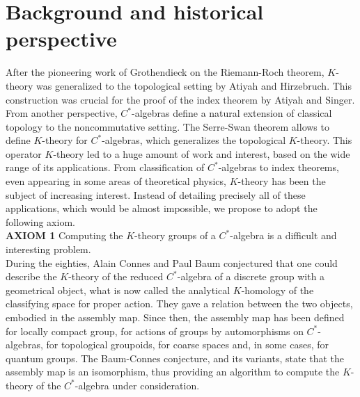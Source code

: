 \section*{Background and historical perspective}

After the pioneering work of Grothendieck on the Riemann-Roch theorem, $K$-theory was generalized to the topological setting by Atiyah and Hirzebruch. This construction was crucial for the proof of the index theorem by Atiyah and Singer. From another perspective, $C^*$-algebras define a natural extension of classical topology to the noncommutative setting. The Serre-Swan theorem allows to define $K$-theory for $C^*$-algebras, which generalizes the topological $K$-theory. This operator $K$-theory led to a huge amount of work and interest, based on the wide range of its applications. From classification of $C^*$-algebras to index theorems, even appearing in some areas of theoretical physics, $K$-theory has been the subject of increasing interest. Instead of detailing precisely all of these applications, which would be almost impossible, we propose to adopt the following axiom.\\   
 
\textbf{AXIOM 1} Computing the $K$-theory groups of a $C^*$-algebra is a difficult and interesting problem.\\ 

During the eighties, Alain Connes and Paul Baum conjectured that one could describe the $K$-theory of the reduced $C^*$-algebra of a discrete group with a geometrical object, what is now called the analytical $K$-homology of the classifying space for proper action. They gave a relation between the two objects, embodied in the assembly map. Since then, the assembly map has been defined for locally compact group, for actions of groups by automorphisms on $C^*$-algebras, for topological groupoids, for coarse spaces and, in some cases, for quantum groups. The Baum-Connes conjecture, and its variants, state that the assembly map is an isomorphism, thus providing an algorithm to compute the $K$-theory of the $C^*$-algebra under consideration.\\

